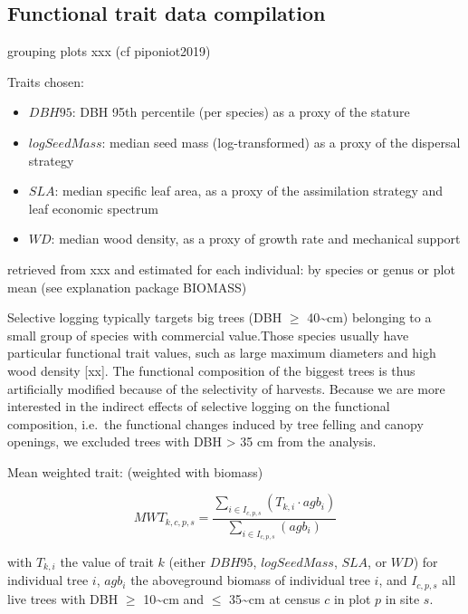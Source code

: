\documentclass[]{elsarticle} %
\begin{document}
\subsection{Functional trait data
compilation}\label{functional-trait-data-compilation}

grouping plots xxx (cf piponiot2019)

Traits chosen:

\begin{itemize}
\item
  \(DBH95\): DBH 95th percentile (per species) as a proxy of the stature
\item
  \(logSeedMass\): median seed mass (log-transformed) as a proxy of the
  dispersal strategy
\item
  \(SLA\): median specific leaf area, as a proxy of the assimilation
  strategy and leaf economic spectrum
\item
  \(WD\): median wood density, as a proxy of growth rate and mechanical
  support
\end{itemize}

retrieved from xxx and estimated for each individual: by species or
genus or plot mean (see explanation package BIOMASS)

Selective logging typically targets big trees (DBH \(\geq\)
40\textasciitilde{}cm) belonging to a small group of species with
commercial value.Those species usually have particular functional trait
values, such as large maximum diameters and high wood density {[}xx{]}.
The functional composition of the biggest trees is thus artificially
modified because of the selectivity of harvests. Because we are more
interested in the indirect effects of selective logging on the
functional composition, i.e.~the functional changes induced by tree
felling and canopy openings, we excluded trees with DBH \textgreater{}
35 cm from the analysis.

Mean weighted trait: (weighted with biomass)

\begin{equation}  
MWT_{k,c,p,s} = \frac{\sum_{i \in I_{c,p,s}}(T_{k,i}\cdot agb_i)}{\sum_{i \in I_{c,p,s}}(agb_i)}
\end{equation}

with \(T_{k,i}\) the value of trait \(k\) (either \(DBH95\),
\(logSeedMass\), \(SLA\), or \(WD\)) for individual tree \(i\),
\(agb_i\) the aboveground biomass of individual tree \(i\), and
\(I_{c,p,s}\) all live trees with DBH \(\geq\) 10\textasciitilde{}cm and
\(\leq\) 35\textasciitilde{}cm at census \(c\) in plot \(p\) in site
\(s\).
\end{document}
